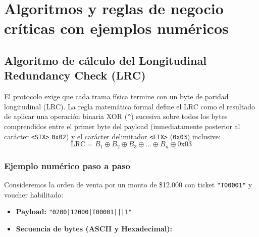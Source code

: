 \documentclass{../../plantilla/raysac-informe}
\begin{document}
\clearpage
\section{Algoritmos y reglas de negocio críticas con ejemplos numéricos}

\subsection{Algoritmo de cálculo del Longitudinal Redundancy Check (LRC)}
El protocolo exige que cada trama física termine con un byte de paridad longitudinal (LRC).
La regla matemática formal define el LRC como el resultado de aplicar una operación binaria XOR
(\texttt{\^{}}) sucesiva sobre todos los bytes comprendidos entre el primer byte del payload
(inmediatamente posterior al carácter \texttt{<STX>} \texttt{0x02}) y el carácter delimitador
\texttt{<ETX>} (\texttt{0x03}) inclusive:
\begin{equation}
\text{LRC} = B_1 \oplus B_2 \oplus B_3 \oplus \dots \oplus B_n \oplus \text{0x03}
\end{equation}

\subsubsection{Ejemplo numérico paso a paso}
Consideremos la orden de venta por un monto de \$12.000 con ticket \texttt{"T00001"} y voucher habilitado:
\begin{itemize}
  \item \textbf{Payload:} \texttt{"0200|12000|T00001|||1"}
  \item \textbf{Secuencia de bytes (ASCII y Hexadecimal):}
\end{itemize}
\end{document}
